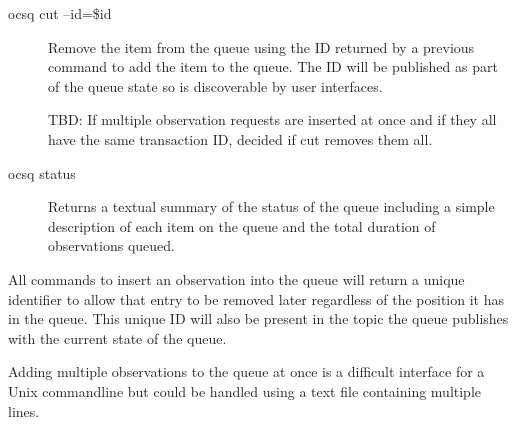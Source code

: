 \documentclass[TS,toc,lsstdraft]{lsstdoc}
\begin{document}
\begin{description}
\item[ocsq cut --id=\$id]

Remove the item from the queue using the ID returned by a previous command to add the item to the queue.
The ID will be published as part of the queue state so is discoverable by user interfaces.

TBD: If multiple observation requests are inserted at once and if they all have the same transaction ID, decided if cut removes them all.

\item[ocsq status]

Returns a textual summary of the status of the queue including a simple description of each item on the queue and the total duration of observations queued.

\end{description}

All commands to insert an observation into the queue will return a unique identifier to allow that entry to be removed later regardless of the position it has in the queue.
This unique ID will also be present in the topic the queue publishes with the current state of the queue.

Adding multiple observations to the queue at once is a difficult interface for a Unix commandline but could be handled using a text file containing multiple lines.
\end{document}

